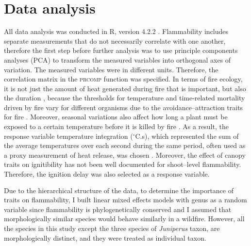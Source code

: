 \documentclass{ttuthes2007}
\newcommand{\pkg}[1]{\textsc{#1}}
\begin{document}
\section{Data analysis}

All data analysis was conducted in R, version 4.2.2 \citep{R}. 
Flammability includes separate measurements that do not necessarily correlate with one another, therefore the first step before further analysis was to use principle components analyses (PCA) to transform the measured variables into orthogonal axes of variation. The measured variables were in different units. Therefore, the correlation matrix in the \pkg{prcomp} function was specified. In terms of fire ecology, it is not just the amount of heat generated during fire that is important, but also the duration \citep{mcgranahan2020inconvenient}, because the thresholds for temperature and time-related mortality driven by fire vary for different organisms \citep{nelson1952observations, vines1968heat, bond1983dead, hengst1994bark, pinard1997fire, lawes2011bark, pingree2019myth} due to the avoidance–attraction traits for fire \citep{schwilk2001flammability, archibald2019unified}. Moreover, seasonal variations also affect how long a plant must be exposed to a certain temperature before it is killed by fire \citep{wright1970method}. As a result, the response variable temperature integration ($^{\circ}$C.s), which represented the sum of the average temperatures over each second during the same period, often used as a proxy measurement of heat release, was chosen \citep{gao2018grass, mcgranahan2020inconvenient}. Moreover, the effect of canopy traits on ignitibility has not been well documented for shoot--level flammability. Therefore, the ignition delay was also selected as a response variable.

Due to the hierarchical structure of the data, to determine the importance of traits on flammability, I built linear mixed effects models with genus as a random variable since flammability is phylogenetically conserved \citep{cui2020shoot} and I assumed that morphologically similar species would behave similarly in a wildfire. However, all the species in this study except the three species of \emph{Juniperus} taxon,
are morphologically distinct, and they were treated as individual taxon. 
\end{document}
